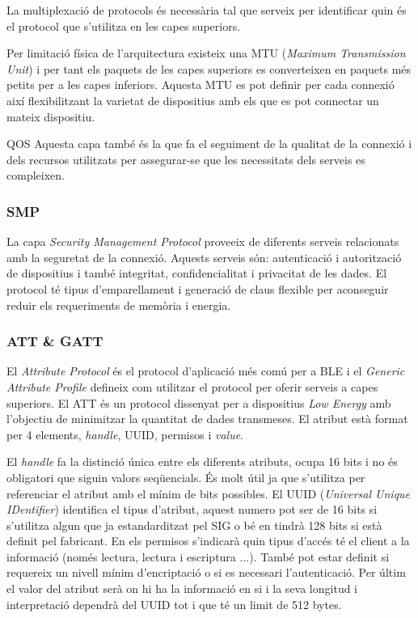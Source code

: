 La multiplexació de protocols és necessària tal que serveix per identificar quin és el protocol que s'utilitza en les capes superiors.

Per limitació física de l'arquitectura existeix una MTU (\textit{Maximum Transmission Unit}) i per tant els paquets de les capes superiors es converteixen en paquets més petits per a les capes inferiors.
Aquesta MTU es pot definir per cada connexió així flexibilitzant la varietat de dispositius amb els que es pot connectar un mateix dispositiu.

QOS Aquesta capa també és la que fa el seguiment de la qualitat de la connexió i dels recursos utilitzats per assegurar-se que les necessitats dels serveis es compleixen.

\subsubsection{SMP}
La capa \textit{Security Management Protocol} proveeix de diferents serveis relacionats amb la seguretat de la connexió.
Aquests serveis són: autenticació i autorització de dispositius i també integritat, confidencialitat i privacitat de les dades.
El protocol té tipus d'emparellament i generació de claus flexible per aconseguir reduir els requeriments de memòria i energia.

\subsubsection{ATT \& GATT}
El \textit{Attribute Protocol} és el protocol d'aplicació més comú per a BLE i el \textit{Generic Attribute Profile} defineix com utilitzar el protocol per oferir serveis a capes superiors.
El ATT és un protocol dissenyat per a dispositius \textit{Low Energy} amb l'objectiu de minimitzar la quantitat de dades transmeses. El atribut està format per 4 elements, \textit{handle}, UUID, permisos  i \textit{value}.

El \textit{handle} fa la distinció única entre els diferents atributs, ocupa 16 bits i no és obligatori que siguin valors seqüencials. És molt útil ja que s'utilitza per referenciar el atribut amb el mínim de bits possibles.
El UUID (\textit{Universal Unique IDentifier}) identifica el tipus d'atribut, aquest numero pot ser de 16 bits si s'utilitza algun que ja estandarditzat pel SIG o bé en tindrà 128 bits si està definit pel fabricant.
En els permisos s'indicarà quin tipus d'accés té el client a la informació (només lectura, lectura i escriptura ...). També pot estar definit si requereix un nivell mínim d'encriptació o si es necessari l'autenticació.
Per últim el valor del atribut serà on hi ha la informació en si i la seva longitud i interpretació dependrà del UUID tot i que té un limit de 512 bytes.


